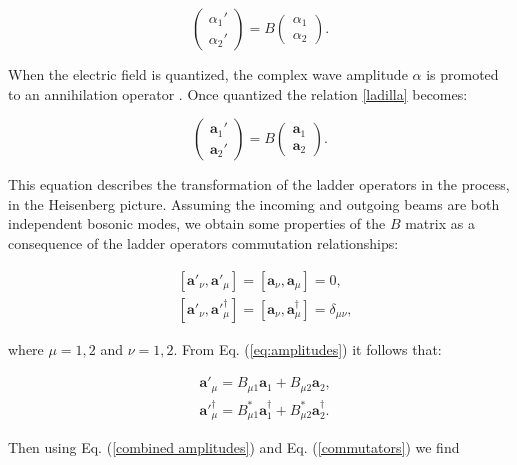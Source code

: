 \documentclass[12pt]{book}
\begin{document}
\begin{equation}
\begin{pmatrix} \alpha_{1}' \\ \alpha_{2}' \end{pmatrix}=B\begin{pmatrix} \alpha_{1} \\ \alpha_{2} \end{pmatrix}. \label{ladilla}
\end{equation}

When the electric field  is quantized, the complex wave amplitude $\alpha$ is promoted to an annihilation operator \cite{ludon}. Once quantized the relation \ref{ladilla} becomes:

\begin{equation}
\begin{pmatrix} \mathbf{a}_{1}' \\ \mathbf{a}_{2}' \end{pmatrix}=B\begin{pmatrix} \mathbf{a}_{1} \\ \mathbf{a}_{2} \end{pmatrix}.
\label{eq:amplitudes}
\end{equation}

This equation describes the transformation of the ladder operators in the process, in the Heisenberg picture. Assuming the incoming and outgoing beams are both independent bosonic modes, we obtain some properties of the $B$ matrix as a consequence of the ladder operators commutation relationships:

\begin{align}
&[\mathbf{a}'_{\nu},\mathbf{a}'_{\mu}]=[\mathbf{a}_{\nu},\mathbf{a}_{\mu}]=0,\\
&[\mathbf{a}'_{\nu},\mathbf{a}'^{\dagger}_{\mu}]=[\mathbf{a}_{\nu},\mathbf{a}^{\dagger}_{\mu}]=\delta_{\mu \nu},
\label{commutators}
\end{align}

where $\mu=1,2$ and $\nu=1,2$. From Eq. (\ref{eq:amplitudes}) it follows that:

\begin{align}
&\mathbf{a}'_{\mu}=B_{\mu 1}\mathbf{a}_{1}+B_{\mu 2} \mathbf{a}_{2}, \\
&\mathbf{a}'^{\dagger}_{\mu}=B_{\mu 1}^{*}\mathbf{a}^{\dagger}_{1}+B_{\mu 2}^{*} \mathbf{a}^{\dagger}_{2}.
\label{combined amplitudes}
\end{align}

Then using Eq. (\ref{combined amplitudes}) and Eq. (\ref{commutators}) we find 
\end{document}
